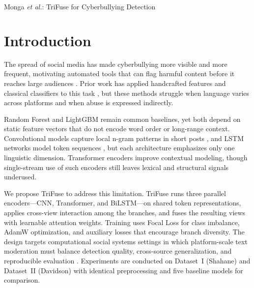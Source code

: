 \documentclass[journal]{IEEEtran}
\begin{document}
\maketitle

\IEEEdisplaynontitleabstractindextext

%
{Monga \MakeLowercase{\textit{et al.}}: TriFuse for Cyberbullying Detection}

\section{Introduction}

The spread of social media has made cyberbullying more visible and more frequent, motivating automated tools that can flag harmful content before it reaches large audiences \cite{ref1}. Prior work has applied handcrafted features and classical classifiers to this task \cite{ref2, ref3, ref4}, but these methods struggle when language varies across platforms and when abuse is expressed indirectly.

Random Forest \cite{ref5} and LightGBM \cite{ref6} remain common baselines, yet both depend on static feature vectors that do not encode word order or long-range context. Convolutional models capture local n-gram patterns in short posts \cite{ref7}, and LSTM networks model token sequences \cite{ref8}, but each architecture emphasizes only one linguistic dimension. Transformer encoders \cite{ref9} improve contextual modeling, though single-stream use of such encoders still leaves lexical and structural signals underused.

We propose TriFuse to address this limitation. TriFuse runs three parallel encoders---CNN, Transformer, and BiLSTM---on shared token representations, applies cross-view interaction among the branches, and fuses the resulting views with learnable attention weights. Training uses Focal Loss for class imbalance, AdamW optimization, and auxiliary losses that encourage branch diversity. The design targets computational social systems settings in which platform-scale text moderation must balance detection quality, cross-source generalization, and reproducible evaluation \cite{ref12, ref21}. Experiments are conducted on Dataset~I (Shahane) \cite{ref10} and Dataset~II (Davidson) \cite{ref11} with identical preprocessing and five baseline models for comparison.
\end{document}
